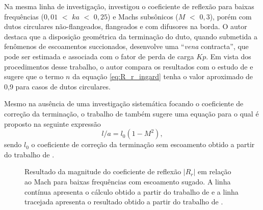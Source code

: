 Na mesma linha de investigação,  investigou o coeficiente de reflexão para baixas frequências ($0,01$ $<$ $ka$ $<$ $0,25$) e Machs subsônicos ($M$ $<$ $0,3$), porém com dutos circulares não-flangeados, flangeados e com difusores na borda. O autor destaca que a disposição geométrica da terminação do duto, quando submetida a fenômenos de escoamentos succionados, desenvolve uma ``\textit{vena} contracta'', que pode ser estimada e associada com o fator de perda de carga $Kp$. Em vista dos procedimentos desse trabalho, o autor compara os resultados com o estudo de  e sugere que o termo $n$ da equação \ref{eq:R_r_ingard} tenha o valor aproximado de 0,9 para casos de dutos circulares. 

Mesmo na ausência de uma investigação sistemática focando o coeficiente de correção da terminação, o trabalho de  também sugere uma equação para o qual é proposto na seguinte expressão
\begin{equation}
    l/a = l_{0}(1 - M^{2}),
    \label{eq:l_M}
\end{equation} 
sendo $l_{0}$ o coeficiente de correção da terminação sem escoamento obtido a partir do trabalho de .


\begin{figure}[h!]
\centering
  \caption[Coeficiente de reflexão $|R_{r}|$ com escoamento sugado]{Resultado da magnitude do coeficiente de reflexão $|R_{r}|$ em relação ao Mach para baixas frequências com escoamento sugado. A linha contínua apresenta o cálculo obtido a partir do trabalho de  e a linha tracejada apresenta o resultado obtido a partir do trabalho de .}
  \label{fig:comp3}
\end{figure}

